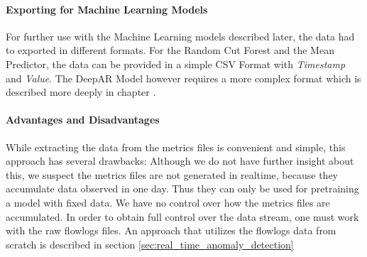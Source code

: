 \paragraph{Exporting for Machine Learning Models}
For further use with the Machine Learning models described later, the data had to exported in different formats. For the Random Cut Forest and the Mean Predictor, the data can be provided in a simple CSV Format with \textit{Timestamp} and \textit{Value}. The DeepAR Model however requires a more complex format which is described more deeply in chapter \pageref{ch:deepar}.
\paragraph{Advantages and Disadvantages}
While extracting the data from the metrics files is convenient and simple, this approach has several drawbacks: Although we do not have further insight about this, we suspect the metrics files are not generated in realtime, because they accumulate data observed in one day. Thus they can only be used for pretraining a model with fixed data. We have no control over how the metrics files are accumulated. In order to obtain full control over the data stream, one must work with the raw flowlogs files. An approach that utilizes the flowlogs data from scratch is described in section \ref{sec:real_time_anomaly_detection}


